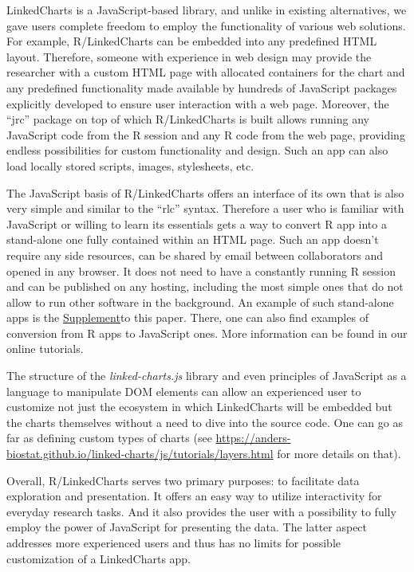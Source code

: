 \documentclass[twocolumn,10pt]{article}
\newcommand{\Supplement}{\href{https://anders-biostat.github.io/lc-paper/}{Supplement}}
\begin{document}
LinkedCharts is a JavaScript-based library, and unlike in existing alternatives, we gave users complete freedom to employ the functionality of various web solutions. For example, R/LinkedCharts can be embedded into any predefined HTML layout. Therefore, someone with experience in web design may provide the researcher with a custom HTML page with allocated containers for the chart and any predefined functionality made available by hundreds of JavaScript packages explicitly developed to ensure user interaction with a web page. Moreover, the ``jrc'' package on top of which R/LinkedCharts is built allows running any JavaScript code from the R session and any R code from the web page, providing endless possibilities for custom functionality and design. Such an app can also load locally stored scripts, images, stylesheets, etc.

The JavaScript basis of R/LinkedCharts offers an interface of its own that is also very simple and similar to the ``rlc'' syntax. Therefore a user who is familiar with JavaScript or willing to learn its essentials gets a way to convert R app into a stand-alone one fully contained within an HTML page. Such an app doesn't require any side resources, can be shared by email between collaborators and opened in any browser. It does not need to have a constantly running R session and can be published on any hosting, including the most simple ones that do not allow to run other software in the background. An example of such stand-alone apps is the \Supplement to this paper. There, one can also find examples of conversion from R apps to JavaScript ones. More information can be found in our online tutorials.

The structure of the \emph{linked-charts.js} library and even principles of JavaScript as a language to manipulate DOM elements can allow an experienced user to customize not just the ecosystem in which LinkedCharts will be embedded but the charts themselves without a need to dive into the source code. One can go as far as defining custom types of charts (see \url{https://anders-biostat.github.io/linked-charts/js/tutorials/layers.html} for more details on that).

Overall, R/LinkedCharts serves two primary purposes: to facilitate data exploration and presentation. It offers an easy way to utilize interactivity for everyday research tasks. And it also provides the user with a possibility to fully employ the power of JavaScript for presenting the data. The latter aspect addresses more experienced users and thus has no limits for possible customization of a LinkedCharts app.
\end{document}
